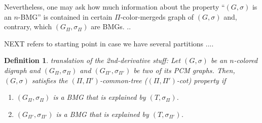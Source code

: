 \documentclass[final,3p,times]{elsarticle}
\newtheorem{definition}{Definition}[section]
\newcommand{\TODO}[1]{\begingroup\color{red}#1\endgroup}
\newcommand{\mh}[1]{\begingroup\color{blue}#1\endgroup}
\begin{document}
Nevertheless, one may ask how much information about the property
``$(G,\sigma)$ is an  $n$-BMG'' is contained in certain
$\Pi$-color-mergeds graph of $(G,\sigma)$ and, contrary, which 
$(G_{\Pi},\sigma_{\Pi})$ are BMGs. .. 













\TODO{\bigskip \bigskip NEXT refers to starting point in case we have several partitions .... }
\begin{definition}\TODO{translation of the 2nd-derivative stuff:}
\mh{
Let $(G,\sigma)$ be an $n$-colored digraph 
and $(G_{\Pi},\sigma_{\Pi})$ and $(G_{\Pi'},\sigma_{\Pi'})$ 
be two of its PCM graphs. 
Then, $(G,\sigma)$ satisfies the $(\Pi,\Pi')$-common-tree ($(\Pi,\Pi')$-cot) property
if 
\begin{enumerate}
	\item $(G_{\Pi},\sigma_{\Pi})$ is a BMG that is explained by $(T,\sigma_{\Pi})$.
	\item $(G_{\Pi'},\sigma_{\Pi'})$ is a BMG that is explained by $(T,\sigma_{\Pi'})$.
\end{enumerate}
}
\end{definition}
\end{document}
